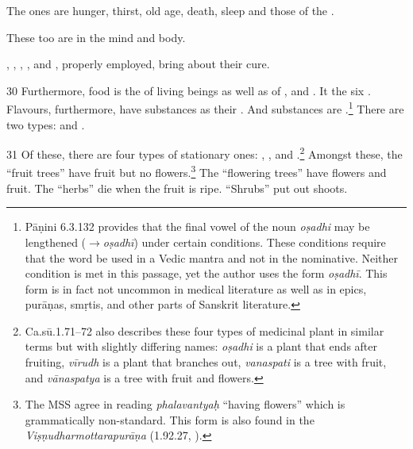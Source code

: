 \begin{translation}
    The  ones are hunger, thirst, old age, death, 
    sleep and  those of the .
    
    These too are  in the mind and body.
    
    ,
    ,
    ,
    ,
     and
    , 
    properly employed, bring about their cure.
    
    
    \item [30] Furthermore, food is the   of living beings as well
    as of ,  and 
    . It  the six .
    Flavours, furthermore, have substances as their .  And
    substances are .\footnote{Pāṇini 6.3.132 provides that
    the final vowel of the noun \emph{oṣadhi} may be lengthened
    (\emph{$\rightarrow$oṣadhī}) under certain conditions.  These conditions require
    that the word be used in a Vedic mantra and not in the nominative.  Neither
    condition is met in this passage, yet the author uses the form \emph{oṣadhī}. 
    This form is in fact not uncommon in medical literature as well as in epics,
    purāṇas, smṛtis, and other parts of Sanskrit literature.} There are 
    two types:
     and .
    
    
    
    \item [31]  Of these, there are four types of stationary ones:
    , ,
     and .\footnote{Ca.sū.1.71--72 
    also
    describes these four types of medicinal plant in similar terms but with slightly
    differing names: \emph{oṣadhi} is a plant that ends after fruiting, \emph{vīrudh}
    is a plant that branches out, \emph{vanaspati} is a tree with fruit, and
    \emph{vānaspatya} is a tree with fruit and flowers.}
    Amongst these, the “fruit trees” have fruit but no flowers.\footnote{The MSS agree 
    in reading \emph{phalavantyaḥ} “having flowers” which is grammatically 
    non-standard. This form is also found in the  \emph{Viṣṇudharmottarapurāṇa} 
    (1.92.27, \cite[1.92.27][56r]{sarm-1912}).}  The “flowering trees” 
    have flowers and fruit.  The “herbs” die when the fruit is ripe. “Shrubs” put out 
    shoots.
    

\end{translation}
